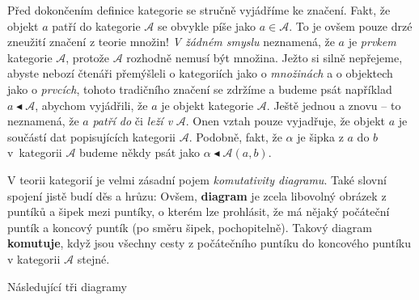 \documentclass[letterpaper,11pt,leqno]{article}
\begin{document}
Před dokončením definice kategorie se stručně vyjádříme ke značení. Fakt, že
objekt $a$ patří do kategorie $\mathcal{A}$ se obvykle píše jako $a \in
\mathcal{A}$. To je ovšem pouze drzé zneužití značení z teorie množin! \emph{V
žádném smyslu} neznamená, že $a$ je \emph{prvkem} kategorie $\mathcal{A}$,
protože $\mathcal{A}$ rozhodně nemusí být množina. Ježto si silně nepřejeme,
abyste nebozí čtenáři přemýšleli o kategoriích jako o \emph{množinách} a o
objektech jako o \emph{prvcích}, tohoto tradičního značení se zdržíme a budeme
psát například $a \blacktriangleleft \mathcal{A}$, abychom vyjádřili, že $a$ je
objekt kategorie $\mathcal{A}$. Ještě jednou a znovu -- to neznamená, že $a$
\emph{patří do} či \emph{leží v} $\mathcal{A}$. Onen vztah pouze vyjadřuje, že
objekt $a$ je součástí dat popisujících kategorii $\mathcal{A}$. Podobně, fakt,
že $\alpha$ je šipka z $a$ do $b$ v~kategorii $\mathcal{A}$ budeme někdy psát
jako $\alpha \blacktriangleleft \mathcal{A}(a,b)$.

V teorii kategorií je velmi zásadní pojem \emph{komutativity diagramu}. Také
slovní spojení jistě budí děs a hrůzu: 
Ovšem, \textbf{diagram} je zcela libovolný obrázek z puntíků a šipek mezi
puntíky, o kterém lze prohlásit, že má nějaký počáteční puntík a koncový puntík
(po směru šipek, pochopitelně). Takový diagram \textbf{komutuje}, když jsou
všechny cesty z počátečního puntíku do koncového puntíku v kategorii
$\mathcal{A}$ stejné.

\begin{example}
 Následující tři diagramy
 \begin{figure}[H]
  \centering
  \begin{subfigure}[b]{.3\textwidth}
   \centering

  \end{subfigure}

 \end{figure}
\end{example}
\end{document}
